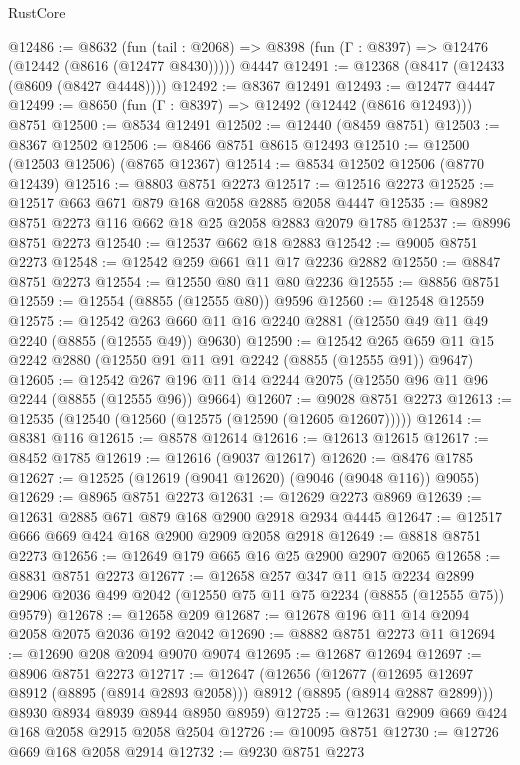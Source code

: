 \begin{lexlean}{RustCore}
\begin{coremodule}
@12486 := @8632
    (fun (tail : @2068) => @8398 (fun (Γ : @8397) => @12476 (@12442 (@8616 (@12477 @8430)))))
    @4447
@12491 := @12368 (@8417 (@12433 (@8609 (@8427 @4448))))
@12492 := @8367 @12491
@12493 := @12477 @4447
@12499 := @8650 (fun (Γ : @8397) => @12492 (@12442 (@8616 @12493))) @8751
@12500 := @8534 @12491
@12502 := @12440 (@8459 @8751)
@12503 := @8367 @12502
@12506 := @8466 @8751 @8615 @12493
@12510 := @12500 (@12503 @12506) (@8765 @12367)
@12514 := @8534 @12502 @12506 (@8770 @12439)
@12516 := @8803 @8751 @2273
@12517 := @12516 @2273
@12525 := @12517 @663 @671 @879 @168 @2058 @2885 @2058 @4447
@12535 := @8982 @8751 @2273 @116 @662 @18 @25 @2058 @2883 @2079 @1785
@12537 := @8996 @8751 @2273
@12540 := @12537 @662 @18 @2883
@12542 := @9005 @8751 @2273
@12548 := @12542 @259 @661 @11 @17 @2236 @2882
@12550 := @8847 @8751 @2273
@12554 := @12550 @80 @11 @80 @2236
@12555 := @8856 @8751
@12559 := @12554 (@8855 (@12555 @80)) @9596
@12560 := @12548 @12559
@12575 := @12542 @263 @660 @11 @16 @2240 @2881 (@12550 @49 @11 @49 @2240 (@8855 (@12555 @49)) @9630)
@12590 := @12542 @265 @659 @11 @15 @2242 @2880 (@12550 @91 @11 @91 @2242 (@8855 (@12555 @91)) @9647)
@12605 := @12542 @267 @196 @11 @14 @2244 @2075 (@12550 @96 @11 @96 @2244 (@8855 (@12555 @96)) @9664)
@12607 := @9028 @8751 @2273
@12613 := @12535 (@12540 (@12560 (@12575 (@12590 (@12605 @12607)))))
@12614 := @8381 @116
@12615 := @8578 @12614
@12616 := @12613 @12615
@12617 := @8452 @1785
@12619 := @12616 (@9037 @12617)
@12620 := @8476 @1785
@12627 := @12525 (@12619 (@9041 @12620) (@9046 (@9048 @116)) @9055)
@12629 := @8965 @8751 @2273
@12631 := @12629 @2273 @8969
@12639 := @12631 @2885 @671 @879 @168 @2900 @2918 @2934 @4445
@12647 := @12517 @666 @669 @424 @168 @2900 @2909 @2058 @2918
@12649 := @8818 @8751 @2273
@12656 := @12649 @179 @665 @16 @25 @2900 @2907 @2065
@12658 := @8831 @8751 @2273
@12677 := @12658
    @257
    @347
    @11
    @15
    @2234
    @2899
    @2906
    @2036
    @499
    @2042
    (@12550 @75 @11 @75 @2234 (@8855 (@12555 @75)) @9579)
@12678 := @12658 @209
@12687 := @12678 @196 @11 @14 @2094 @2058 @2075 @2036 @192 @2042
@12690 := @8882 @8751 @2273 @11
@12694 := @12690 @208 @2094 @9070 @9074
@12695 := @12687 @12694
@12697 := @8906 @8751 @2273
@12717 := @12647
    (@12656
      (@12677 (@12695 @12697 @8912 (@8895 (@8914 @2893 @2058))) @8912 (@8895 (@8914 @2887 @2899)))
      @8930
      @8934
      @8939
      @8944
      @8950
      @8959)
@12725 := @12631 @2909 @669 @424 @168 @2058 @2915 @2058 @2504
@12726 := @10095 @8751
@12730 := @12726 @669 @168 @2058 @2914
@12732 := @9230 @8751 @2273

\end{coremodule}
\end{lexlean}
